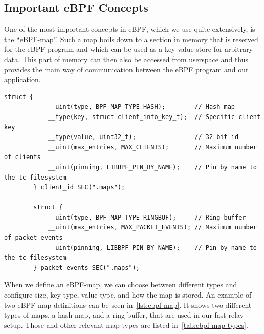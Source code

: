 \subsection{Important eBPF Concepts}
One of the most important concepts in eBPF, which we use quite extensively, is 
the ``eBPF-map''.
Such a map boils down to a section in memory that is reserved for the eBPF program
and which can be used as a key-value store for arbitrary data.
This part of memory can then also be accessed from userspace and thus provides the main 
way of communication between the eBPF program and our application.


\vspace{0.5cm}
\noindent\begin{minipage}{\textwidth}
    \begin{lstlisting}[style=CStyle,caption={Examplary eBPF map definitions.}, label={lst:ebpf-map}]
        struct {
            __uint(type, BPF_MAP_TYPE_HASH);        // Hash map
            __type(key, struct client_info_key_t);  // Specific client key
            __type(value, uint32_t);                // 32 bit id
            __uint(max_entries, MAX_CLIENTS);       // Maximum number of clients
            __uint(pinning, LIBBPF_PIN_BY_NAME);    // Pin by name to the tc filesystem
        } client_id SEC(".maps");

        struct {
            __uint(type, BPF_MAP_TYPE_RINGBUF);     // Ring buffer
            __uint(max_entries, MAX_PACKET_EVENTS); // Maximum number of packet events
            __uint(pinning, LIBBPF_PIN_BY_NAME);    // Pin by name to the tc filesystem
        } packet_events SEC(".maps");
    \end{lstlisting}
\end{minipage}
\vspace{0.5cm}

When we define an eBPF-map, we can choose between different types and configure
size, key type, value type, and how the map is stored. %
An example of two eBPF-map definitions can be seen in~\autoref{lst:ebpf-map}.
It shows two different types of maps, a hash map, and a ring buffer, that are used in
our fast-relay setup.
Those and other relevant map types are listed in~\autoref{tab:ebpf-map-types}.


\vspace{0.5cm}

